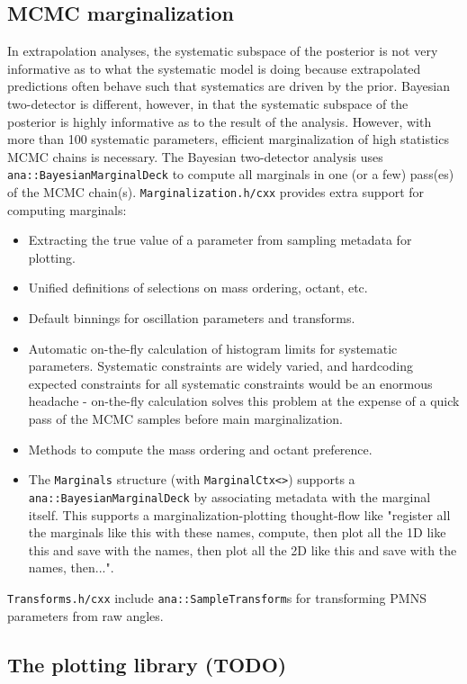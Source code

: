 \documentclass{article}
\begin{document}
\subsection{MCMC marginalization}
In extrapolation analyses, the systematic subspace of the posterior is not very informative as to what the systematic model is doing because extrapolated predictions often behave such that systematics are driven by the prior. Bayesian two-detector is different, however, in that the systematic subspace of the posterior is highly informative as to the result of the analysis. However, with more than 100 systematic parameters, efficient marginalization of high statistics MCMC chains is necessary. The Bayesian two-detector analysis uses \texttt{ana::BayesianMarginalDeck} to compute all marginals in one (or a few) pass(es) of the MCMC chain(s). \texttt{Marginalization.h/cxx} provides extra support for computing marginals:
\begin{itemize}
    \item Extracting the true value of a parameter from sampling metadata for plotting.
    \item Unified definitions of selections on mass ordering, octant, etc.
    \item Default binnings for oscillation parameters and transforms.
    \item Automatic on-the-fly calculation of histogram limits for systematic parameters. Systematic constraints are widely varied, and hardcoding expected constraints for all systematic constraints would be an enormous headache - on-the-fly calculation solves this problem at the expense of a quick pass of the MCMC samples before main marginalization.
    \item Methods to compute the mass ordering and octant preference.
    \item The \texttt{Marginals} structure (with \texttt{MarginalCtx<>}) supports a \texttt{ana::BayesianMarginalDeck} by associating metadata with the marginal itself. This supports a marginalization-plotting thought-flow like "register all the marginals like this with these names, compute, then plot all the 1D like this and save with the names, then plot all the 2D like this and save with the names, then...".
\end{itemize}
\texttt{Transforms.h/cxx} include \texttt{ana::SampleTransform}s for transforming PMNS parameters from raw angles.

\subsection{The plotting library (TODO)}
\end{document}
